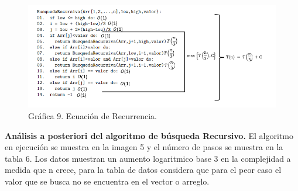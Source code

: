 \documentclass[12pt,twoside]{article}
\begin{document}
\newpage
\begin{figure}[h]
  \begin{center}
    \includegraphics[width=0.85\linewidth]{images/apriori2.png}
    \\
    Gráfica 9. Ecuación de Recurrencia.
  \end{center}
\end{figure}
\newpage
\textbf{Análisis a posteriori del algoritmo de búsqueda Recursivo.}
El algoritmo en ejecución se muestra en la imagen 5 y el número de pasos se muestra en la tabla 6. Los datos
muestran un aumento logaritmico base 3 en la complejidad a medida que n crece, para la tabla de datos considera
que para el peor caso el valor que se busca no se encuentra en el vector o arreglo.
\par
\end{document}
